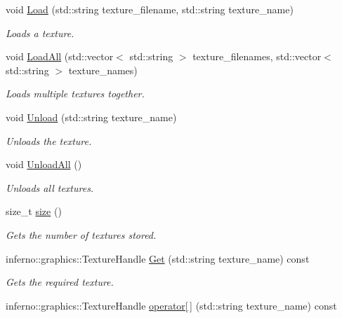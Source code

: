 \begin{DoxyCompactItemize}
void \mbox{\hyperlink{classinferno_1_1graphics_1_1_texture_manager_aa8a3d242633cc83fd3fe178520d15cb6}{Load}} (std\+::string texture\+\_\+filename, std\+::string texture\+\_\+name)
\begin{DoxyCompactList}\small\item\em Loads a texture. \end{DoxyCompactList}\item 
void \mbox{\hyperlink{classinferno_1_1graphics_1_1_texture_manager_ae1c0a268b96073bb0c925e3523f2bc58}{Load\+All}} (std\+::vector$<$ std\+::string $>$ texture\+\_\+filenames, std\+::vector$<$ std\+::string $>$ texture\+\_\+names)
\begin{DoxyCompactList}\small\item\em Loads multiple textures together. \end{DoxyCompactList}\item 
void \mbox{\hyperlink{classinferno_1_1graphics_1_1_texture_manager_af860bd092645a0c99afa35d3e978f3d8}{Unload}} (std\+::string texture\+\_\+name)
\begin{DoxyCompactList}\small\item\em Unloads the texture. \end{DoxyCompactList}\item 
void \mbox{\hyperlink{classinferno_1_1graphics_1_1_texture_manager_ab3f3fbf66a7c133ed129e1433b1c7cee}{Unload\+All}} ()
\begin{DoxyCompactList}\small\item\em Unloads all textures. \end{DoxyCompactList}\item 
size\+\_\+t \mbox{\hyperlink{classinferno_1_1graphics_1_1_texture_manager_a7b5b7ee8f6c1a65f63de017a933549ef}{size}} ()
\begin{DoxyCompactList}\small\item\em Gets the number of textures stored. \end{DoxyCompactList}\item 
inferno\+::graphics\+::\+Texture\+Handle \mbox{\hyperlink{classinferno_1_1graphics_1_1_texture_manager_ae2b18c9725addce31e35034ea6642fbf}{Get}} (std\+::string texture\+\_\+name) const
\begin{DoxyCompactList}\small\item\em Gets the required texture. \end{DoxyCompactList}\item 
inferno\+::graphics\+::\+Texture\+Handle \mbox{\hyperlink{classinferno_1_1graphics_1_1_texture_manager_a419b62740d0cbff686820b9b4ccc95e2}{operator\mbox{[}$\,$\mbox{]}}} (std\+::string texture\+\_\+name) const

\end{DoxyCompactItemize}
